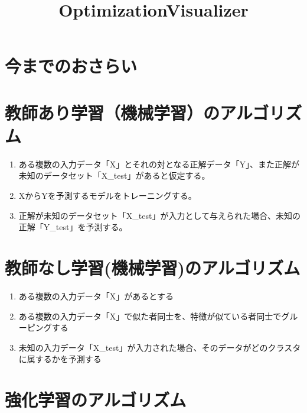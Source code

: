 \documentclass[11pt]{article}
\title{OptimizationVisualizer}
\providecommand{\tightlist}{%
      \setlength{\itemsep}{0pt}\setlength{\parskip}{0pt}}
\begin{document}
    
    
    \maketitle
    
    

    
    \section{今までのおさらい}\label{ux4ecaux307eux3067ux306eux304aux3055ux3089ux3044}

    \section{教師あり学習（機械学習）のアルゴリズム}\label{ux6559ux5e2bux3042ux308aux5b66ux7fd2ux6a5fux68b0ux5b66ux7fd2ux306eux30a2ux30ebux30b4ux30eaux30baux30e0}

\begin{enumerate}
\def\labelenumi{\arabic{enumi}.}
\tightlist
\item
  ある複数の入力データ「X」とそれの対となる正解データ「Y」、また正解が未知のデータセット「X\_test」があると仮定する。
\item
  XからYを予測するモデルをトレーニングする。
\item
  正解が未知のデータセット「X\_test」が入力として与えられた場合、未知の正解「Y\_test」を予測する。
\end{enumerate}

    \section{教師なし学習(機械学習)のアルゴリズム}\label{ux6559ux5e2bux306aux3057ux5b66ux7fd2ux6a5fux68b0ux5b66ux7fd2ux306eux30a2ux30ebux30b4ux30eaux30baux30e0}

\begin{enumerate}
\def\labelenumi{\arabic{enumi}.}
\tightlist
\item
  ある複数の入力データ「X」があるとする
\item
  ある複数の入力データ「X」で似た者同士を、特徴が似ている者同士でグルーピングする
\item
  未知の入力データ「X\_test」が入力された場合、そのデータがどのクラスタに属するかを予測する
\end{enumerate}

    \section{強化学習のアルゴリズム}\label{ux5f37ux5316ux5b66ux7fd2ux306eux30a2ux30ebux30b4ux30eaux30baux30e0}
\end{document}
